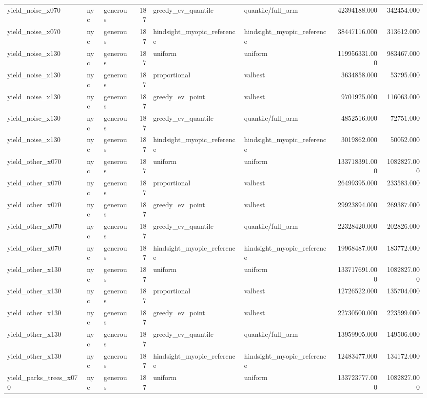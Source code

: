 \begin{tabular}{lllrllrr}
yield\_noise\_x070 & nyc & generous & 187 & greedy\_ev\_quantile & quantile/full\_arm & 42394188.000 & 342454.000 \\
yield\_noise\_x070 & nyc & generous & 187 & hindsight\_myopic\_reference & hindsight\_myopic\_reference & 38447116.000 & 313612.000 \\
yield\_noise\_x130 & nyc & generous & 187 & uniform & uniform & 119956331.000 & 983467.000 \\
yield\_noise\_x130 & nyc & generous & 187 & proportional & valbest & 3634858.000 & 53795.000 \\
yield\_noise\_x130 & nyc & generous & 187 & greedy\_ev\_point & valbest & 9701925.000 & 116063.000 \\
yield\_noise\_x130 & nyc & generous & 187 & greedy\_ev\_quantile & quantile/full\_arm & 4852516.000 & 72751.000 \\
yield\_noise\_x130 & nyc & generous & 187 & hindsight\_myopic\_reference & hindsight\_myopic\_reference & 3019862.000 & 50052.000 \\
yield\_other\_x070 & nyc & generous & 187 & uniform & uniform & 133718391.000 & 1082827.000 \\
yield\_other\_x070 & nyc & generous & 187 & proportional & valbest & 26499395.000 & 233583.000 \\
yield\_other\_x070 & nyc & generous & 187 & greedy\_ev\_point & valbest & 29923894.000 & 269387.000 \\
yield\_other\_x070 & nyc & generous & 187 & greedy\_ev\_quantile & quantile/full\_arm & 22328420.000 & 202826.000 \\
yield\_other\_x070 & nyc & generous & 187 & hindsight\_myopic\_reference & hindsight\_myopic\_reference & 19968487.000 & 183772.000 \\
yield\_other\_x130 & nyc & generous & 187 & uniform & uniform & 133717691.000 & 1082827.000 \\
yield\_other\_x130 & nyc & generous & 187 & proportional & valbest & 12726522.000 & 135704.000 \\
yield\_other\_x130 & nyc & generous & 187 & greedy\_ev\_point & valbest & 22730500.000 & 223599.000 \\
yield\_other\_x130 & nyc & generous & 187 & greedy\_ev\_quantile & quantile/full\_arm & 13959905.000 & 149506.000 \\
yield\_other\_x130 & nyc & generous & 187 & hindsight\_myopic\_reference & hindsight\_myopic\_reference & 12483477.000 & 134172.000 \\
yield\_parks\_trees\_x070 & nyc & generous & 187 & uniform & uniform & 133723777.000 & 1082827.000 \\

\end{tabular}
